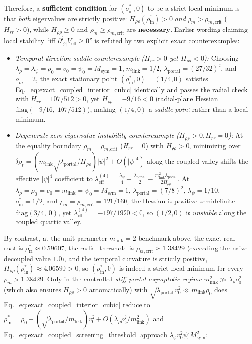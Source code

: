 \begin{enumerate}[leftmargin=2em]
\begin{align}
  \end{align}
  Therefore, a \textbf{sufficient condition} for $(\rho_{\mathrm{in}}^*, 0)$ to be a strict local minimum is that \emph{both} eigenvalues are strictly positive: $H_{\rho\rho}(\rho_{\mathrm{in}}^*) > 0$ \emph{and} $\rho_m > \rho_{m,\mathrm{crit}}$ ($H_{rr} > 0$), while $H_{\rho\rho} \ge 0$ and $\rho_m \ge \rho_{m,\mathrm{crit}}$ are \textbf{necessary}. Earlier wording claiming local stability ``iff $\partial_{|\psi|}^2 V_{\mathrm{eff}} \ge 0$'' is refuted by two explicit exact counterexamples:
  \begin{itemize}
    \item \emph{Temporal-direction saddle counterexample ($H_{rr} > 0$ yet $H_{\rho\rho} < 0$):} Choosing $\lambda_\rho = \lambda_\psi = \rho_0 = v_0 = \psi_0 = M_{\mathrm{sym}} = 1$, $m_{\mathrm{link}} = 1/2$, $\lambda_{\mathrm{portal}} = (27/32)^2$, and $\rho_m = 2$, the exact stationary point $(\rho_{\mathrm{in}}^*, 0) = (1/4, 0)$ satisfies Eq.~\eqref{eq:exact_coupled_interior_cubic} identically and passes the radial check with $H_{rr} = 107/512 > 0$, yet $H_{\rho\rho} = -9/16 < 0$ (radial-plane Hessian $\mathrm{diag}(-9/16,\; 107/512)$), making $(1/4, 0)$ a \emph{saddle point} rather than a local minimum.
    \item \emph{Degenerate zero-eigenvalue instability counterexample ($H_{\rho\rho} > 0, H_{rr} = 0$):} At the equality boundary $\rho_m = \rho_{m,\mathrm{crit}}$ ($H_{rr} = 0$) with $H_{\rho\rho} > 0$, minimizing over $\delta\rho_t = (m_{\mathrm{link}}\sqrt{\lambda_{\mathrm{portal}}}/H_{\rho\rho})|\psi|^2 + O(|\psi|^4)$ along the coupled valley shifts the effective $|\psi|^4$ coefficient to $\lambda_{\mathrm{eff}}^{(4)} = \frac{\lambda_\psi}{4} + \frac{\lambda_{\mathrm{portal}}}{2} - \frac{m_{\mathrm{link}}^2\lambda_{\mathrm{portal}}}{2 H_{\rho\rho}}$. At $\lambda_\rho = \rho_0 = v_0 = m_{\mathrm{link}} = \psi_0 = M_{\mathrm{sym}} = 1$, $\lambda_{\mathrm{portal}} = (7/8)^2$, $\lambda_\psi = 1/10$, $\rho_{\mathrm{in}}^* = 1/2$, and $\rho_m = \rho_{m,\mathrm{crit}} = 121/160$, the Hessian is positive semidefinite $\mathrm{diag}(3/4,\; 0)$, yet $\lambda_{\mathrm{eff}}^{(4)} = -197/1920 < 0$, so $(1/2, 0)$ is \emph{unstable} along the coupled quartic valley.
  \end{itemize}
  By contrast, at the unit-parameter $m_{\mathrm{link}} = 2$ benchmark above, the exact real root is $\rho_{\mathrm{in}}^* \approx 0.59607$, the radial threshold is $\rho_{m,\mathrm{crit}} \approx 1.38429$ (exceeding the naive decoupled value $1.0$), and the temporal curvature is strictly positive, $H_{\rho\rho}(\rho_{\mathrm{in}}^*) \approx 4.06590 > 0$, so $(\rho_{\mathrm{in}}^*, 0)$ is indeed a strict local minimum for every $\rho_m > 1.38429$. Only in the controlled \emph{stiff-portal asymptotic regime} $m_{\mathrm{link}}^2 \gg \lambda_\rho\rho_0^2$ (which also ensures $H_{\rho\rho} > 0$ automatically) with $\sqrt{\lambda_{\mathrm{portal}}}\,v_0^2 \ll m_{\mathrm{link}}\rho_0$ does Eq.~\eqref{eq:exact_coupled_interior_cubic} reduce to $\rho_{\mathrm{in}}^* = \rho_0 - (\sqrt{\lambda_{\mathrm{portal}}}/m_{\mathrm{link}})v_0^2 + O(\lambda_\rho\rho_0^2/m_{\mathrm{link}}^2)$ and Eq.~\eqref{eq:exact_coupled_screening_threshold} approach $\lambda_\psi v_0^2\psi_0^2 M_{\mathrm{sym}}^2$:

\end{enumerate}
